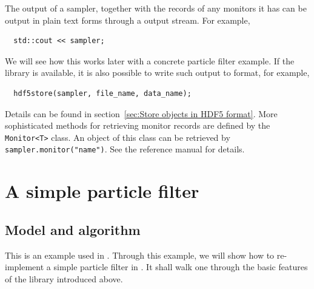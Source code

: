The output of a sampler, together with the records of any monitors it has can
be output in plain text forms through a \cpp output stream. For example,
\begin{Verbatim}
  std::cout << sampler;
\end{Verbatim}
We will see how this works later with a concrete particle filter example. If
the \hdf library is available, it is also possible to write such output to \hdf
format, for example,
\begin{Verbatim}
  hdf5store(sampler, file_name, data_name);
\end{Verbatim}
Details can be found in section~\ref{sec:Store objects in HDF5 format}. More
sophisticated methods for retrieving monitor records are defined by the
\verb|Monitor<T>| class. An object of this class can be retrieved by
\verb|sampler.monitor("name")|. See the reference manual for details.

\section{A simple particle filter}
\label{sec:A simple particle filter}

\subsection{Model and algorithm}
\label{sub:Model and algorithm}

This is an example used in \textcite{Johansen:2009wd}. Through this example, we
will show how to re-implement a simple particle filter in \vsmc. It shall walk
one through the basic features of the library introduced above.

